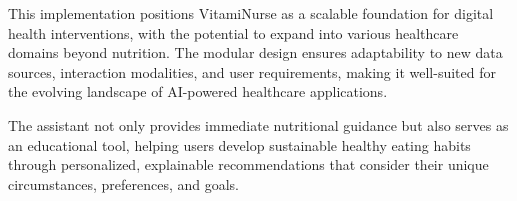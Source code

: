 This implementation positions VitamiNurse as a scalable foundation for digital health interventions, with the potential to expand into various healthcare domains beyond nutrition. The modular design ensures adaptability to new data sources, interaction modalities, and user requirements, making it well-suited for the evolving landscape of AI-powered healthcare applications.

The assistant not only provides immediate nutritional guidance but also serves as an educational tool, helping users develop sustainable healthy eating habits through personalized, explainable recommendations that consider their unique circumstances, preferences, and goals.

